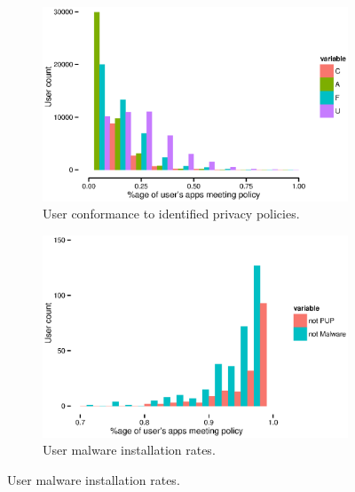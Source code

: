 \documentclass[a4paper]{scrartcl}
\begin{document}
\begin{figure}\centering
  \begin{subfigure}[b]{0.48\linewidth}
    \includegraphics[width=\linewidth]{./images/lin-2yr.eps}
    \caption{User conformance to identified privacy policies.}
    \label{sfig:lin}
  \end{subfigure}
  \begin{subfigure}[b]{0.48\linewidth}
    \includegraphics[width=\linewidth]{./images/malware-2yr.eps}
    \caption{User malware installation rates.}
    \label{sfig:malware}
  \end{subfigure}


\end{figure}
\end{document}
